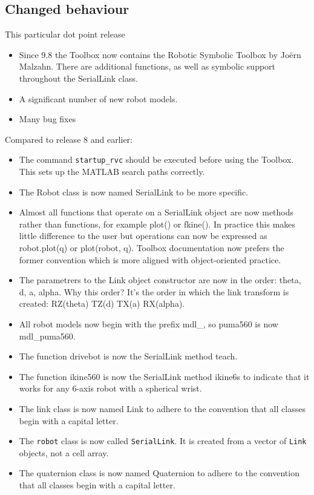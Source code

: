 \documentclass[a4paper]{report}
\begin{document}
\subsection{Changed behaviour}
This particular dot point release
\begin{itemize}
\item Since 9.8 the Toolbox now contains the Robotic Symbolic Toolbox
by Jo\"{e}rn Malzahn.  There are additional functions, as well as symbolic
support throughout the SerialLink class.
\item A significant number of new robot models.
\item Many bug fixes
\end{itemize}

Compared to release 8 and earlier:
\begin{itemize}
\item The command \texttt{startup\_rvc} should be executed before using the Toolbox.  This sets up the MATLAB search paths correctly.
\item The Robot class is now named SerialLink to be more specific.
\item Almost all functions that operate on a SerialLink object are now methods rather than functions, for example plot() or fkine(). In practice this makes little difference to the user but operations can now be expressed as robot.plot(q) or plot(robot, q). Toolbox documentation now prefers the former convention which is more aligned with object-oriented practice.
\item The parametrers to the Link object constructor are now in the order: theta, d, a, alpha. Why this order? It's the order in which the link transform is created: RZ(theta) TZ(d) TX(a) RX(alpha).
\item All robot models now begin with the prefix mdl\_, so puma560 is now mdl\_puma560.
\item The function drivebot is now the SerialLink method teach.
\item The function ikine560 is now the SerialLink method ikine6s to indicate that it works for any 6-axis robot with a spherical wrist.
\item The link class is now named Link to adhere to the convention that all classes begin with a capital letter.
\item The \texttt{robot} class is now called \texttt{SerialLink}.  It is created from a vector of \texttt{Link} objects, not a cell array.
\item The quaternion class is now named Quaternion to adhere to the convention that all classes begin with a capital letter.

\end{itemize}
\end{document}
